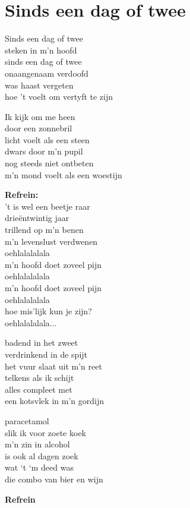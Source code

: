 \section{Sinds een dag of twee}

Sinds een dag of twee\\
steken in m'n hoofd\\
sinds een dag of twee\\
onaangenaam verdoofd\\
was haast vergeten\\
hoe 't voelt om vertyft te zijn

Ik kijk om me heen\\
door een zonnebril\\
licht voelt als een steen\\
dwars door m'n pupil\\
nog steeds niet ontbeten\\
m'n mond voelt als een woestijn

\textbf{Refrein:}\\
't is wel een beetje raar\\
drieëntwintig jaar\\
trillend op m'n benen\\
m'n levenslust verdwenen\\
oehlalalalala\\
m'n hoofd doet zoveel pijn\\
oehlalalalala\\
m'n hoofd doet zoveel pijn\\
oehlalalalala\\
hoe mis’lijk kun je zijn?\\
oehlalalalala...

badend in het zweet\\
verdrinkend in de spijt\\
het vuur slaat uit m’n reet\\
telkens als ik schijt\\
alles compleet met\\
een kotsvlek in m’n gordijn

paracetamol \\
slik ik voor zoete koek\\
m'n zin in alcohol\\
is ook al dagen zoek\\
wat ‘t ‘m deed was\\
die combo van bier en wijn

\textbf{Refrein}
